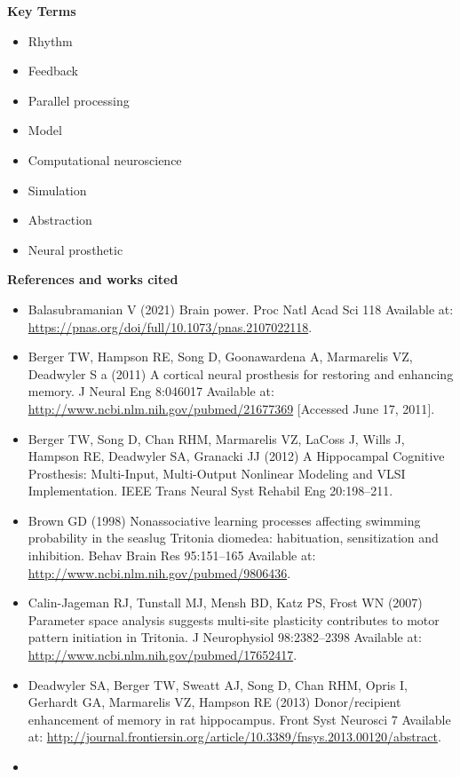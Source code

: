 \documentclass[
]{book}
\begin{document}
\textbf{Key Terms}

\begin{itemize}
\item
  Rhythm
\item
  Feedback
\item
  Parallel processing
\item
  Model
\item
  Computational neuroscience
\item
  Simulation
\item
  Abstraction
\item
  Neural prosthetic
\end{itemize}

\textbf{References and works cited}

\begin{itemize}
\item
  Balasubramanian V (2021) Brain power. Proc Natl Acad Sci 118 Available at: \url{https://pnas.org/doi/full/10.1073/pnas.2107022118}.
\item
  Berger TW, Hampson RE, Song D, Goonawardena A, Marmarelis VZ, Deadwyler S a (2011) A cortical neural prosthesis for restoring and enhancing memory. J Neural Eng 8:046017 Available at: \url{http://www.ncbi.nlm.nih.gov/pubmed/21677369} {[}Accessed June 17, 2011{]}.
\item
  Berger TW, Song D, Chan RHM, Marmarelis VZ, LaCoss J, Wills J, Hampson RE, Deadwyler SA, Granacki JJ (2012) A Hippocampal Cognitive Prosthesis: Multi-Input, Multi-Output Nonlinear Modeling and VLSI Implementation. IEEE Trans Neural Syst Rehabil Eng 20:198--211.
\item
  Brown GD (1998) Nonassociative learning processes affecting swimming probability in the seaslug Tritonia diomedea: habituation, sensitization and inhibition. Behav Brain Res 95:151--165 Available at: \url{http://www.ncbi.nlm.nih.gov/pubmed/9806436}.
\item
  Calin-Jageman RJ, Tunstall MJ, Mensh BD, Katz PS, Frost WN (2007) Parameter space analysis suggests multi-site plasticity contributes to motor pattern initiation in Tritonia. J Neurophysiol 98:2382--2398 Available at: \url{http://www.ncbi.nlm.nih.gov/pubmed/17652417}.
\item
  Deadwyler SA, Berger TW, Sweatt AJ, Song D, Chan RHM, Opris I, Gerhardt GA, Marmarelis VZ, Hampson RE (2013) Donor/recipient enhancement of memory in rat hippocampus. Front Syst Neurosci 7 Available at: \url{http://journal.frontiersin.org/article/10.3389/fnsys.2013.00120/abstract}.
\item

\end{itemize}
\end{document}
